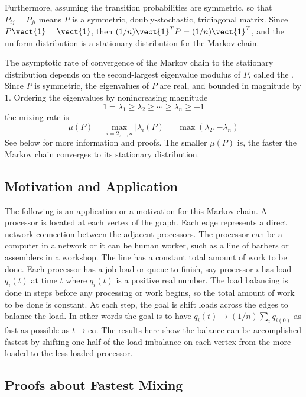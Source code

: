 \documentclass[12pt]{article}
\begin{document}
Furthermore, assuming the transition probabilities are symmetric, so
that \( P_{ij} = P_{ji} \) means \( P \) is a symmetric,
doubly-stochastic, tridiagonal matrix.  Since \( P \vect {1} = \vect{1} \),
then \( (1/n) \vect{1}^T P = (1/n) \vect{1}^T \), and the uniform
distribution is a stationary distribution for the Markov chain.

The asymptotic rate of convergence of the Markov chain to the stationary
distribution depends on the second-largest eigenvalue modulus of \( P \),
called the .%
Since \( P \) is symmetric, the eigenvalues of \( P \) are real, and
bounded in magnitude by \( 1 \).  Ordering the eigenvalues by
nonincreasing magnitude
\[
    1 = \lambda_1 \ge \lambda_2 \ge \cdots \ge \lambda_n \ge -1
\] the mixing rate is
\[
    \mu(P) = \max_{i=2,\dots,n} | \lambda_i(P) | = \max(\lambda_2, -\lambda_n)
\] See below for more information and proofs.  The smaller \( \mu(P) \)
is, the faster the Markov chain converges to its stationary
distribution.

\subsection*{Motivation and Application}

The following is an application or a motivation for this Markov chain.
A processor is located at each vertex of the graph.  Each edge
represents a direct network connection between the adjacent processors.
The processor can be a computer in a network or it can be human worker,
such as a line of barbers or assemblers in a workshop.  The line has a
constant total amount of work to be done.  Each processor has a job load
or queue to finish, say processor \( i \) has load \( q_i (t) \) at time
\( t \) where \( q_i(t) \) is a positive real number. The load balancing
is done in steps before any processing or work begins, so the total
amount of work to be done is constant.  At each step, the goal is shift
loads across the edges to balance the load.  In other words the goal is
to have \( q_i(t) \to (1/n) \sum_i q_{i(0)} \) as fast as possible as \(
t \to \infty \).  The results here show the balance can be accomplished
fastest by shifting one-half of the load imbalance on each vertex from
the more loaded to the less loaded processor.

\subsection*{Proofs about Fastest Mixing }
\end{document}
